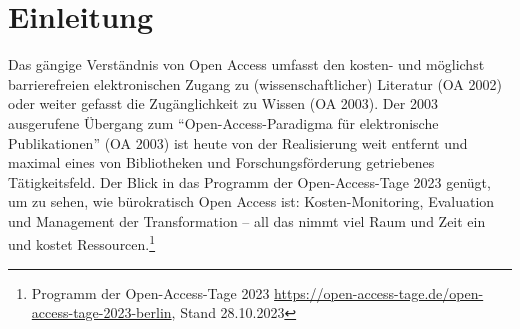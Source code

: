 \documentclass[a4paper,
fontsize=11pt,
oneside,
numbers=noperiodatend,
parskip=half-,
bibliography=totoc,
final
]{scrartcl}
\title{\LARGE{Kamptaler Sakrallandschaften im Wikiversum} \vskip 1em \large{dits mit Versionsgeschichte: Elementarteilchen offener Wissensproduktion am Beispiel eines Citizen Science-Projektes}}%
\author{Christian Erlinger und Jens Bemme} %
\date{}
\begin{document}
\maketitle
\thispagestyle{fancyplain} 

\begin{abstract}
\noindent
Die Autoren skizzieren, dass insbesondere lokales und regionales Wissen
mit Wikis entsteht und dauerhaft bleibt -- als Regionalia in globalen
offenen Linkzusammenhängen. ``Grass Root Open Access'' bedeutet nicht
nur, Publikationen auf selbst gezimmerte Art und Weise frei und unter
offener Lizenz zu publizieren (``I have published my pdf under a cc
license on my personal website''). ``Grass Root Open Science'' bedeutet
auch, den Inhalt, die Daten und Bilder -- das Wissen einer
publizistischen Arbeit an sich frei, offen und reproduzierbar zu
veröffentlichen. Am Beispiel der ``Wikifizierung'' einer gedruckten,
heimatkundlichen Buchpublikation wird gezeigt, wie mit
Graswurzelstrategien im Wikiversums Open Science entsteht.

Wir skizzieren einen solchen Prozess als `linked open': Methoden und
Effekte regionaler Datenpflege als demokratisierende Praxis mittels
Citizen Science, mit Blick auf Technologien und Gemeinschaften.
Potentiell beeinflussen wir mit offenen, wiki-basierten und damit
dezentralen Wissenssystemen die Kalkulation und Rentabilität
öffentlicher und quasi-öffentlicher Investitionen in Bildungsressourcen,
Informationsinfrastrukturen, Forschung und Entwicklung.
\end{abstract}

\hypertarget{einleitung}{%
\section{Einleitung}\label{einleitung}}

Das gängige Verständnis von Open Access umfasst den kosten- und
möglichst barrierefreien elektronischen Zugang zu (wissenschaftlicher)
Literatur (OA 2002) oder weiter gefasst die Zugänglichkeit zu Wissen (OA
2003). Der 2003 ausgerufene Übergang zum \enquote{Open-Access-Pa\-ra\-dig\-ma
für elektronische Publikationen} (OA 2003) ist heute von der
Realisierung weit entfernt und maximal eines von Bibliotheken und
Forschungsförderung getriebenes Tätigkeitsfeld. Der Blick in das
Programm der Open-Access-Tage 2023 genügt, um zu sehen, wie bürokratisch
Open Access ist: Kosten-Monitoring, Evaluation und Management der
Transformation -- all das nimmt viel Raum und Zeit ein und kostet
Ressourcen.\footnote{Programm der Open-Access-Tage 2023
  \url{https://open-access-tage.de/open-access-tage-2023-berlin}, Stand
  28.10.2023}
\end{document}
